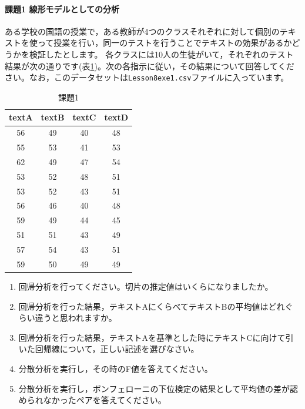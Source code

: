 \documentclass{ltjsarticle}
\begin{document}
\paragraph{課題1 線形モデルとしての分析}
ある学校の国語の授業で，ある教師が4つのクラスそれぞれに対して個別のテキストを使って授業を行い，同一のテストを行うことでテキストの効果があるかどうかを検証したとします。
各クラスには10人の生徒がいて，それぞれのテスト結果が次の通りです(表\ref{L23::exe1})。次の各指示に従い，その結果について回答してください。なお，このデータセットは\texttt{Lesson8exe1.csv}ファイルに入っています。
\begin{table}[ht]
  \centering

  \caption{課題1}
\begin{tabular}{cccc}
  \hline
  textA & textB & textC & textD\\
  \hline
  56 & 49 & 40 & 48\\
  55 & 53 & 41 & 53\\
  62 & 49 & 47 & 54\\
  53 & 52 & 48 & 51\\
  53 & 52 & 43 & 51\\
  56 & 46 & 40 & 48\\
  59 & 49 & 44 & 45\\
  51 & 51 & 43 & 49\\
  57 & 54 & 43 & 51\\
  59 & 50 & 49 & 49\\
  \hline
  \end{tabular}
  \label{L23::exe1}
\end{table}

\begin{enumerate}
  \item 回帰分析を行ってください。切片の推定値はいくらになりましたか。
  \item 回帰分析を行った結果，テキストAにくらべてテキストBの平均値はどれぐらい違うと思われますか。
  \item 回帰分析を行った結果，テキストAを基準とした時にテキストCに向けて引いた回帰線について，正しい記述を選びなさい。
  \item 分散分析を実行し，その時のF値を答えてください。
  \item 分散分析を実行し，ボンフェローニの下位検定の結果として平均値の差が認められなかったペアを答えてください。
\end{enumerate}
\end{document}
